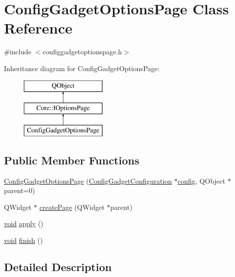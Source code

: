 \hypertarget{class_config_gadget_options_page}{\section{Config\-Gadget\-Options\-Page Class Reference}
\label{class_config_gadget_options_page}
}


{\ttfamily \#include $<$configgadgetoptionspage.\-h$>$}

Inheritance diagram for Config\-Gadget\-Options\-Page\-:\begin{figure}[H]
\begin{center}
\leavevmode
\includegraphics[height=3.000000cm]{class_config_gadget_options_page}
\end{center}
\end{figure}
\subsection*{Public Member Functions}
\begin{DoxyCompactItemize}
\item 
\hyperlink{group___config_plugin_ga2d5af20878472037582f441a56bca28c}{Config\-Gadget\-Options\-Page} (\hyperlink{class_config_gadget_configuration}{Config\-Gadget\-Configuration} $\ast$\hyperlink{deflate_8c_a4473b5227787415097004fd39f55185e}{config}, Q\-Object $\ast$parent=0)
\item 
Q\-Widget $\ast$ \hyperlink{group___config_plugin_ga28c537e8f2468debe3c869bda53fd6c9}{create\-Page} (Q\-Widget $\ast$parent)
\item 
\hyperlink{group___u_a_v_objects_plugin_ga444cf2ff3f0ecbe028adce838d373f5c}{void} \hyperlink{group___config_plugin_gab4d162de9174c38e3567e117a5b5c70f}{apply} ()
\item 
\hyperlink{group___u_a_v_objects_plugin_ga444cf2ff3f0ecbe028adce838d373f5c}{void} \hyperlink{group___config_plugin_gae12bea8fac88d0fd0b9d3c95b0e62472}{finish} ()
\end{DoxyCompactItemize}


\subsection{Detailed Description}


